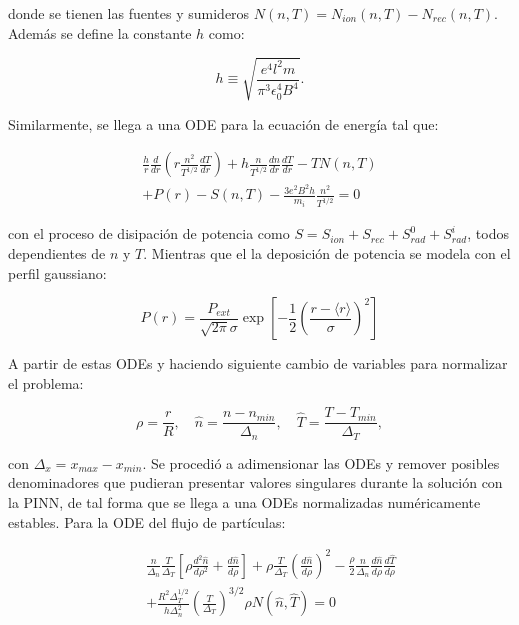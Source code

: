 donde se tienen las fuentes y sumideros $N(n, T) = N_{ion}(n, T)  - N_{rec}(n, T)$. Además se define la constante $h$ como:

\begin{equation}
	h \equiv \sqrt{\frac{e^4 l^2 m}{\pi^3 \epsilon_0^4 B^4}}.
\end{equation}

Similarmente, se llega a una ODE para la ecuación de energía tal que:

\begin{eqnarray}\label{eq:energyODE}
	\frac{h}{r}\frac{d}{dr}\left(r\frac{n^2}{T^{1/2}}\frac{dT}{dr}\right) + h\frac{n}{T^{1/2}}\frac{dn}{dr}\frac{dT}{dr}  - TN(n,T) \nonumber \\
	+ P(r) - S(n, T) - \frac{3e^2B^2 h}{m_i}\frac{n^2}{T^{1/2}}= 0
\end{eqnarray}

con el proceso de disipación de potencia como $S = S_{ion} + S_{rec} + S_{rad}^0+ S_{rad}^i$, todos dependientes de $n$ y $T$. Mientras que el la deposición de potencia se modela con el perfil gaussiano:

\begin{equation}
	P(r) = \frac{P_{ext}}{\sqrt{2\pi}\sigma}\exp{\left[-\frac{1}{2}\left(\frac{r - \langle r \rangle}{\sigma}\right)^2\right]}
\end{equation}

A partir de estas ODEs y haciendo siguiente cambio de variables para normalizar el problema:

\begin{equation}
	\rho = \frac{r}{R}, \quad \hat{n} = \frac{n - n_{min}}{\Delta_n}, \quad  \hat{T} = \frac{T - T_{min}}{\Delta_T},
\end{equation}

con $\Delta_x = x_{max} - x_{min}$. Se procedió a adimensionar las ODEs y remover posibles denominadores que pudieran presentar valores singulares durante la solución con la PINN, de tal forma que se llega a una ODEs normalizadas numéricamente estables. Para la ODE del flujo de partículas:

\begin{eqnarray}\label{eq:partODEnorm}
	&&\frac{n}{\Delta_n}\frac{T}{\Delta_T}\left[\rho\frac{d^2\hat{n}}{d\rho^2} + \frac{d\hat{n}}{d\rho}\right] + \rho\frac{T}{\Delta_T}\left(\frac{d\hat{n}}{d\rho}\right)^2- \frac{\rho}{2}\frac{n}{\Delta_n}\frac{d\hat{n}}{d\rho}\frac{d\hat{T}}{d\rho} \nonumber \\
	 &&+ \frac{R^2\Delta_T^{1/2}}{h\Delta_n^2}\left(\frac{T}{\Delta_T}\right)^{3/2}\rho N(\hat{n}, \hat{T}) = 0
\end{eqnarray}

